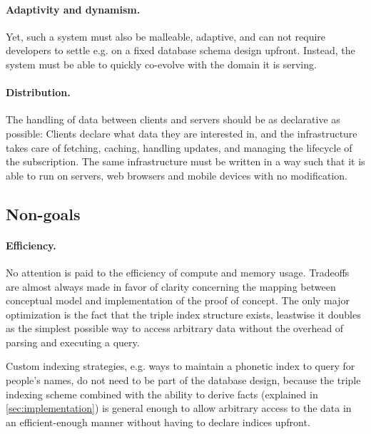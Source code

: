\paragraph{Adaptivity and dynamism.} Yet, such a system must also be malleable, adaptive, and can not require developers to settle e.g. on a fixed database schema design upfront. Instead, the system must be able to quickly co-evolve with the domain it is serving.


\paragraph{Distribution.}
The handling of data between clients and servers should be as declarative as possible: Clients declare what data they are interested in, and the infrastructure takes care of fetching, caching, handling updates, and managing the lifecycle of the subscription. The same infrastructure must be written in a way such that it is able to run on servers, web browsers and mobile devices with no modification.


\subsection{Non-goals}\label{sec:nongoals}


\paragraph{Efficiency.}
No attention is paid to the efficiency of compute and memory usage. Tradeoffs are almost always made in favor of clarity concerning the mapping between conceptual model and implementation of the proof of concept. The only major optimization is the fact that the triple index structure exists, leastwise it doubles as the simplest possible way to access arbitrary data without the overhead of parsing and executing a query.

Custom indexing strategies, e.g. ways to maintain a phonetic index to query for people's names, do not need to be part of the database design, because the triple indexing scheme combined with the ability to derive facts (explained in \autoref{sec:implementation}) is general enough to allow arbitrary access to the data in an efficient-enough manner without having to declare indices upfront.

